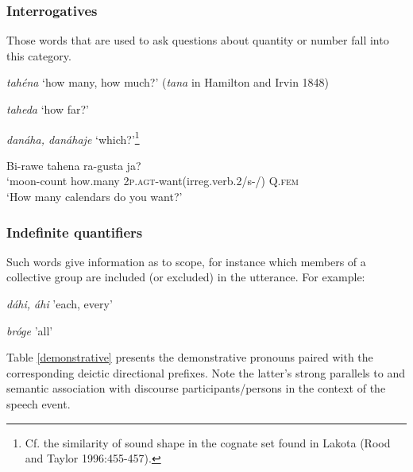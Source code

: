 \documentclass[output=paper]{LSP/langsci}
\begin{document}
\subsubsection{Interrogatives}

Those words that are used to ask questions about quantity or number fall into this category.  

\hspace{2em} \textit{tah\'ena} `how many, how much?'       (\textit{tana} in Hamilton and Irvin 1848)

\hspace{2em} \textit{taheda}  `how far?'  

\hspace{2em} \textit{dan\'aha, dan\'ahaje}  `which?'\footnote{Cf. the similarity of sound shape in the cognate set found in Lakota (Rood and Taylor 1996:455-457).}


\ea  \gll Bi-rawe   tahena   ra-gusta         		 ja? 	\\			          		
`moon-count  how.many    2\textsc{p.agt}-want(irreg.verb.2/s-/) Q.\textsc{fem}	\\					
\glt `How many calendars do you want?'  
\z

\subsubsection{Indefinite quantifiers}  

Such words give information as to scope, for instance which members of a collective group are included (or excluded) in the utterance. For example:  

\hspace{2em} \textit{d\'ahi, \'ahi}  'each, every'

\hspace{2em} \textit{br\'oge}  'all'
       								                   	 
Table \ref{demonstrative} presents the demonstrative pronouns paired with the corresponding deictic directional prefixes.  Note the latter's strong parallels to and semantic association with discourse participants/persons in the context of the speech event.
\end{document}
